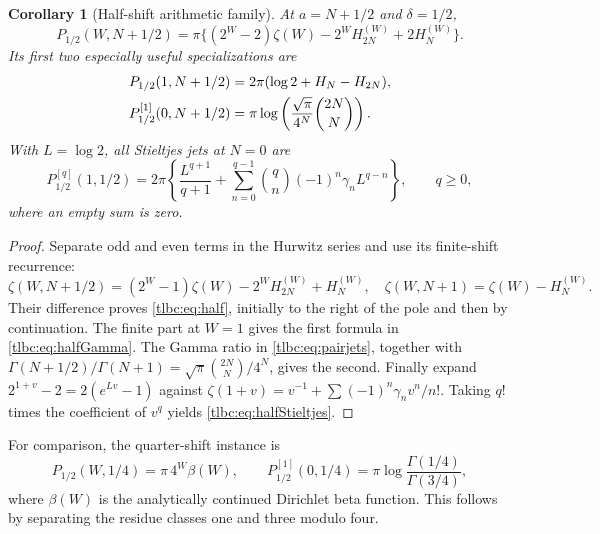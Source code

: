 \documentclass[11pt,letterpaper]{article}
\numberwithin{equation}{section}
\newtheorem{corollary}[theorem]{Corollary}
\theoremstyle{definition}\newtheorem{definition}[theorem]{Definition}
\theoremstyle{remark}\newtheorem{remark}[theorem]{Remark}
\begin{document}
\begin{corollary}[Half-shift arithmetic family]\label{tlbc:cor:half}
At $a=N+1/2$ and $\delta=1/2$,
\begin{equation}\label{tlbc:eq:half}
 P_{1/2}(W,N+1/2)
 =\pi\{(2^W-2)\zeta(W)-2^WH_{2N}^{(W)}+2H_N^{(W)}\}.
\end{equation}
Its first two especially useful specializations are
\begin{align}
 P_{1/2}(1,N+1/2)&=2\pi(\log2+H_N-H_{2N}),\notag\\
 P_{1/2}^{[1]}(0,N+1/2)
 &=\pi\log\left(\frac{\sqrt\pi}{4^N}\binom{2N}{N}\right).
 \label{tlbc:eq:halfGamma}
\end{align}
With $L=\log2$, all Stieltjes jets at $N=0$ are
\begin{equation}\label{tlbc:eq:halfStieltjes}
 P_{1/2}^{[q]}(1,1/2)
 =2\pi\left\{\frac{L^{q+1}}{q+1}
       +\sum_{n=0}^{q-1}\binom qn(-1)^n\gamma_n L^{q-n}\right\},
 \qquad q\ge0,
\end{equation}
where an empty sum is zero.
\end{corollary}
\begin{proof}
Separate odd and even terms in the Hurwitz series and use its finite-shift recurrence:
\[
 \zeta(W,N+1/2)=(2^W-1)\zeta(W)-2^WH_{2N}^{(W)}+H_N^{(W)},
 \quad \zeta(W,N+1)=\zeta(W)-H_N^{(W)}.
\]
Their difference proves \eqref{tlbc:eq:half}, initially to the right of the pole and then by continuation. The finite part at $W=1$ gives the first formula in \eqref{tlbc:eq:halfGamma}. The Gamma ratio in \eqref{tlbc:eq:pairjets}, together with
$\Gamma(N+1/2)/\Gamma(N+1)=\sqrt\pi\binom{2N}{N}/4^N$, gives the second.
Finally expand $2^{1+v}-2=2(e^{Lv}-1)$ against
$\zeta(1+v)=v^{-1}+\sum(-1)^n\gamma_n v^n/n!$. Taking $q!$ times the coefficient of $v^q$ yields \eqref{tlbc:eq:halfStieltjes}.
\end{proof}
For comparison, the quarter-shift instance is
\begin{equation}\label{tlbc:eq:quarter}
 P_{1/2}(W,1/4)=\pi\,4^W\beta(W),\qquad
 P_{1/2}^{[1]}(0,1/4)=\pi\log\frac{\Gamma(1/4)}{\Gamma(3/4)},
\end{equation}
where $\beta(W)$ is the analytically continued Dirichlet beta function. This follows by separating the residue classes one and three modulo four.
\end{document}
